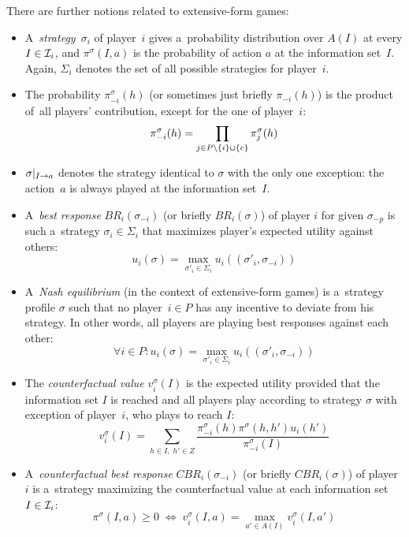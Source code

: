 There are further notions related to extensive-form games:
\begin{itemize}
  \item A~\emph{strategy}~$\sigma_i$ of player~$i$ gives a~probability distribution over $A(I)$ at every $I \in \mathcal{I}_i$, and $\pi ^\sigma (I, a)$ is the probability of action $a$ at the information set~$I$.
    Again, $\Sigma_i$ denotes the set of all possible strategies for player~$i$.

  \item The probability $\pi _{-i} ^\sigma (h)$ (or sometimes just briefly $\pi _{-i} (h)$) is the product of~all players' contribution, except for the one of player~$i$:
    \[\pi _{-i} ^\sigma(h) = \prod _{j \in P \setminus \left\{ i \right\} \cup \left\{ c \right\}} \pi _j ^\sigma (h)\]
    
  \item $\sigma | _{I \rightarrow a}$ denotes the strategy identical to $\sigma$ with the only one exception:
    the action~$a$ is always played at the information set~$I$.

  \item A~\emph{best response} $BR _i (\sigma _{-i})$ (or briefly $BR _i (\sigma)$) of player $i$ for given $\sigma _{-p}$ is such a~strategy $\sigma _i \in \Sigma _i$ that maximizes player's expected utility against others:
    \[ u_i (\sigma) = \max _{\sigma'_i \in \Sigma_i} u_i ((\sigma'_i, \sigma_{-i})) \]

  \item A~\emph{Nash equilibrium} (in the context of extensive-form games) is a~strategy profile $\sigma$ such that no player~$i \in P$ has any incentive to deviate from his strategy.
    In other words, all players are playing best responses against each other:
    \[ \forall i \in P\colon u_i (\sigma) = \max _{\sigma'_i \in \Sigma_i} u_i ((\sigma'_i, \sigma_{-i})) \]

  \item The \emph{counterfactual value} $v _i ^\sigma (I)$ is the expected utility provided that the information set $I$ is reached and all players play according to strategy $\sigma$ with exception of player~$i$, who plays to reach $I$:
    \[ v _i ^\sigma (I) = \sum\limits _{h \in I, \; h' \in Z}
      \frac
      {\pi _{-i} ^\sigma(h) \pi ^\sigma(h,h') u_i(h')}
      {\pi _{-i} ^\sigma (I)} \]

  \item A~\emph{counterfactual best response} $CBR _i (\sigma _{-i})$ (or briefly $CBR _i (\sigma)$) of player~$i$ is a~strategy maximizing the counterfactual value at each information set $I \in \mathcal{I} _i$:
    \[ \pi ^\sigma (I, a) \geq 0
      \; \Longleftrightarrow \;
      v _i ^\sigma (I, a) = \max _{a' \in A(I)} v _i ^\sigma (I, a') \]


\end{itemize}
